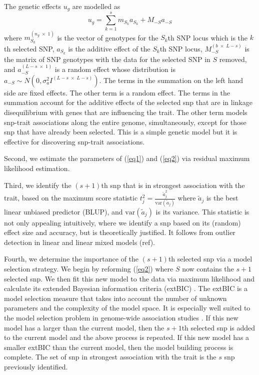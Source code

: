 \documentclass{article}
\begin{document}
The genetic effects $u_g$ are modelled as 
\begin{equation}
\label{eq2}
u_g = \sum_{k=1}^s  m_{S_k} a_{S_k} + M_{-S} a_{-S}
\end{equation}
where $m_{S_k}^{(n_g \; \times \; 1)}$ is the vector of genotypes for the $S_k$th SNP locus which is the $k$th selected SNP, 
$a_{S_k}$ is the additive effect of the $S_k$th SNP locus, $M_{-S}^{(b \; \times \; L-s)}$ is the matrix of  SNP genotypes 
with the data for the selected SNP in $S$ removed,  and $a_{-S}^{(L-s \; \times  \; 1)}$ is a random effect whose distribution is 
$a_{-S} \sim N(0, \sigma_a^2 I^{(L-s \; \times \;  L-s)})$. 
The terms in the summation on the left hand side are fixed effects.  The other term is a random effect.  The terms 
in the summation account 
for the additive effects of the selected snp that are in linkage disequilibrium with genes that are influencing the trait. The other term models 
snp-trait associations along the entire genome, simultaneously, except for those snp that have already been selected. 
This is a simple genetic model but it 
is effective for discovering snp-trait associations. 


Second, we estimate the parameters of (\ref{eq1}) and (\ref{eq2}) via residual maximum likelihood estimation. 

Third, we identify the $(s+1)$th snp that is in strongest association with the trait, based on the maximum score statistic
$t_j^2 = \frac{ \widetilde{a} _j^2}{\textrm{var}(\widetilde{a}_j)}$ where $\widetilde{a}_j$ is the best linear unbiased predictor (BLUP), 
and $\textrm{var}(\widetilde{a}_j)$ is its variance. This statistic is not only appealing intuitively, where we 
identify a snp based on its (random) effect size and accuracy, but is theoretically justified.  It follows from outlier detection 
in linear and linear mixed models (ref). 

Fourth, we determine the importance of the $(s+1)$th selected snp via a model selection strategy. 
We begin by reforming (\ref{eq2}) where $S$ now contains the $s + 1$ selected snp.  We then fit this new model to the data
via maximum likelihood and calculate its extended Bayesian information criteria (extBIC) \cite{chen2008extended}.  The 
extBIC is a model selection measure that takes into account the number of unknown parameters and the complexity 
of the model space.  It is especially well suited to the model selection problem in genome-wide association studies \cite{chen2008extended}. If this new model has a larger  than the current model, then the $s+1$th selected snp is added to 
the current model and the above process is repeated. If this new model has a smaller extBIC than the current model, then the 
model building process is complete. The set of snp in strongest association with the trait is the $s$ snp previously identified. 
\end{document}

